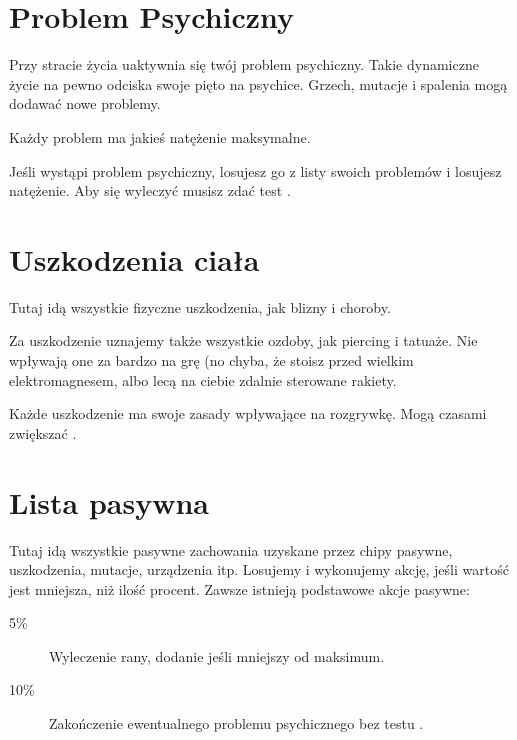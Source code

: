 \section{Problem Psychiczny}
Przy stracie życia uaktywnia się twój problem psychiczny.
Takie dynamiczne życie na pewno odciska swoje pięto na psychice. 
Grzech, mutacje i spalenia mogą dodawać nowe problemy.

Każdy problem ma jakieś natężenie maksymalne.

Jeśli wystąpi problem psychiczny, losujesz go z listy swoich problemów i losujesz natężenie.
Aby się wyleczyć musisz zdać test \abh.

\section{Uszkodzenia ciała}
Tutaj idą wszystkie fizyczne uszkodzenia, jak blizny i choroby.

Za uszkodzenie uznajemy także wszystkie ozdoby, jak piercing i tatuaże.
Nie wpływają one za bardzo na grę (no chyba, że stoisz przed wielkim elektromagnesem, albo lecą na ciebie zdalnie sterowane rakiety.

Każde uszkodzenie ma swoje zasady wpływające na rozgrywkę.
Mogą czasami zwiększać \abnkp.

\section{Lista pasywna}
Tutaj idą wszystkie pasywne zachowania uzyskane przez chipy pasywne, uszkodzenia, mutacje, urządzenia itp.
Losujemy \dc i wykonujemy akcję, jeśli wartość jest mniejsza, niż ilość procent.
Zawsze istnieją podstawowe akcje pasywne:
\begin{description}
\item[5\%] Wyleczenie rany, dodanie \abzyc jeśli mniejszy od maksimum.
\item[10\%] Zakończenie ewentualnego problemu psychicznego bez testu \abh.
\end{description}





